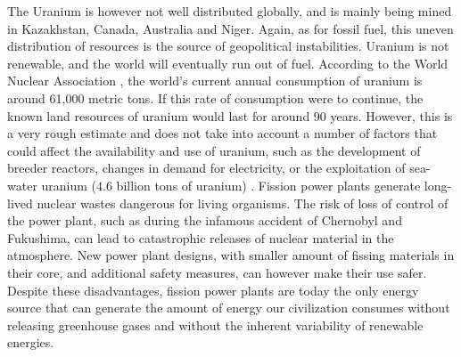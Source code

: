 \documentclass[my_thesis.tex]{subfiles}
\begin{document}
The Uranium is however not well distributed globally, and is mainly being mined in Kazakhstan, Canada, Australia and Niger. Again, as for fossil fuel, this uneven distribution of resources is the source of geopolitical instabilities. Uranium is not renewable, and the world will eventually run out of fuel. According to the World Nuclear Association \citep{worldnuclearassociationUraniumSuppliesSupply2022}, the world's current annual consumption of uranium is around 61,000 metric tons. If this rate of consumption were to continue, the known land resources of uranium would last for around 90 years. However, this is a very rough estimate and does not take into account a number of factors that could affect the availability and use of uranium, such as the development of breeder reactors, changes in demand for electricity, or the exploitation of sea-water uranium ($4.6$ billion tons of uranium) \citep{dunganUraniumSeawaterInfinite2017}. Fission power plants generate long-lived nuclear wastes dangerous for living organisms. The risk of loss of control of the power plant, such as during the infamous accident of Chernobyl and Fukushima, can lead to catastrophic releases of nuclear material in the atmosphere. New power plant designs, with smaller amount of fissing materials in their core, and additional safety measures, can however make their use safer.  Despite these disadvantages, fission power plants are today the only energy source that can generate the amount of energy our civilization consumes without releasing greenhouse gases and without the inherent variability of renewable energies.
\end{document}
